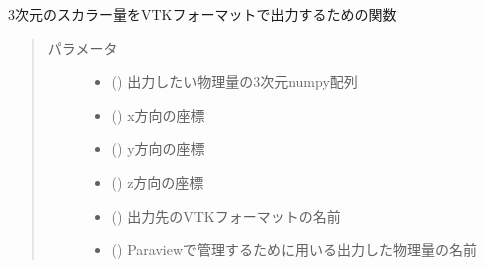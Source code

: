 \documentclass[letterpaper,10pt,dvipdfmx,report]{sphinxmanual}
\begin{document}
\begin{fulllineitems}
\label{\detokenize{paraview:R2D2.vtk.write_3D}}
3次元のスカラー量をVTKフォーマットで出力するための関数
\begin{quote}\begin{description}
\item[{パラメータ}] \leavevmode\begin{itemize}
\item {} 
 () \sphinxhyphen{}\sphinxhyphen{} 出力したい物理量の3次元numpy配列

\item {} 
 () \sphinxhyphen{}\sphinxhyphen{} x方向の座標

\item {} 
 () \sphinxhyphen{}\sphinxhyphen{} y方向の座標

\item {} 
 () \sphinxhyphen{}\sphinxhyphen{} z方向の座標

\item {} 
 () \sphinxhyphen{}\sphinxhyphen{} 出力先のVTKフォーマットの名前

\item {} 
 () \sphinxhyphen{}\sphinxhyphen{} Paraviewで管理するために用いる出力した物理量の名前

\end{itemize}

\end{description}\end{quote}

\end{fulllineitems}

\end{document}
